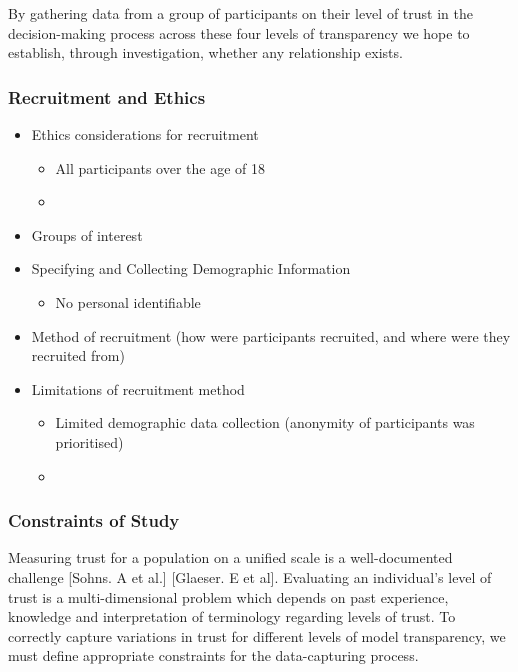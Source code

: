 \documentclass[manuscript,screen,review]{acmart}
\begin{document}
By gathering data from a group of participants on their level of trust in the decision-making process across these four levels of transparency we hope to establish, through investigation, whether any relationship exists. 

\subsubsection{Recruitment and Ethics} 
\label{study1_recruitment}
\begin{itemize}
\item Ethics considerations for recruitment
\begin{itemize}
\item All participants over the age of 18
\item 
\end{itemize}
\item Groups of interest
\item Specifying and Collecting Demographic Information
\begin{itemize}
\item No personal identifiable 
\end{itemize}
\item Method of recruitment (how were participants recruited, and where were they recruited from)
\item Limitations of recruitment method
\begin{itemize}
\item Limited demographic data collection (anonymity of participants was prioritised)
\item 
\end{itemize}
\end{itemize}





\subsubsection{Constraints of Study}
\label{study1_constraints}

Measuring trust for a population on a unified scale is a well-documented challenge [Sohns. A et al.] [Glaeser. E et al]. Evaluating an individual's level of trust is a multi-dimensional problem which depends on past experience, knowledge and interpretation of terminology regarding levels of trust. To correctly capture variations in trust for different levels of model transparency, we must define appropriate constraints for the data-capturing process.
\end{document}
